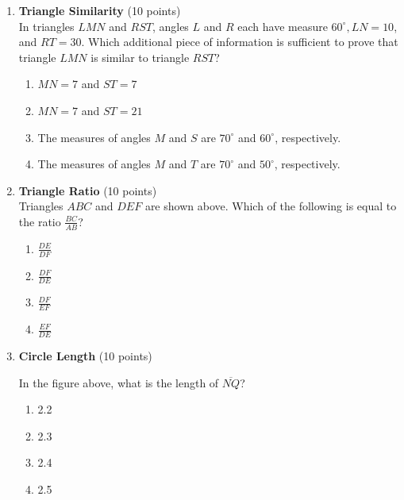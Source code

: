 \begin{enumerate}
  \item \textbf{Triangle Similarity} (10 points)\\
  In triangles $L M N$ and $R S T$, angles $L$ and $R$ each have measure $60^{\circ}, L N=10$, and $R T=30$. Which additional piece of information is sufficient to prove that triangle $L M N$ is similar to triangle $R S T$?\\
  \begin{enumerate}[label=(\Alph*)]
    \item $M N=7$ and $S T=7$
    \item $M N=7$ and $S T=21$
    \item The measures of angles $M$ and $S$ are $70^{\circ}$ and $60^{\circ}$, respectively.
    \item The measures of angles $M$ and $T$ are $70^{\circ}$ and $50^{\circ}$, respectively.
  \end{enumerate}
  \begin{subanswer}
  \end{subanswer}

  \newpage

  \item \textbf{Triangle Ratio} (10 points)\\
  Triangles $A B C$ and $D E F$ are shown above. Which of the following is equal to the ratio $\frac{B C}{A B}$?\\
  \begin{enumerate}[label=(\Alph*)]
    \item $\frac{D E}{D F}$
    \item $\frac{D F}{D E}$
    \item $\frac{D F}{E F}$
    \item $\frac{E F}{D E}$
  \end{enumerate}
  \begin{subanswer}
  \end{subanswer}

  \item \textbf{Circle Length} (10 points)\\

  In the figure above, what is the length of $\overline{N Q}$?\\
  \begin{enumerate}[label=(\Alph*)]
    \item 2.2
    \item 2.3
    \item 2.4
    \item 2.5
  \end{enumerate}
  \begin{subanswer}
  \end{subanswer}


\end{enumerate}
